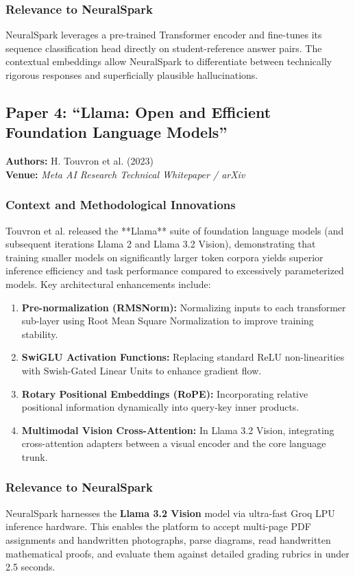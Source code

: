\subsubsection{Relevance to NeuralSpark}
NeuralSpark leverages a pre-trained Transformer encoder and fine-tunes its sequence classification head directly on student-reference answer pairs. The contextual embeddings allow NeuralSpark to differentiate between technically rigorous responses and superficially plausible hallucinations.

\subsection{Paper 4: ``Llama: Open and Efficient Foundation Language Models''}
\textbf{Authors:} H. Touvron et al. (2023) \cite{touvron2023} \\
\textbf{Venue:} \textit{Meta AI Research Technical Whitepaper / arXiv}

\subsubsection{Context and Methodological Innovations}
Touvron et al. released the **Llama** suite of foundation language models (and subsequent iterations Llama 2 and Llama 3.2 Vision), demonstrating that training smaller models on significantly larger token corpora yields superior inference efficiency and task performance compared to excessively parameterized models. Key architectural enhancements include:
\begin{enumerate}[leftmargin=*]
    \item \textbf{Pre-normalization (RMSNorm):} Normalizing inputs to each transformer sub-layer using Root Mean Square Normalization to improve training stability.
    \item \textbf{SwiGLU Activation Functions:} Replacing standard ReLU non-linearities with Swish-Gated Linear Units to enhance gradient flow.
    \item \textbf{Rotary Positional Embeddings (RoPE):} Incorporating relative positional information dynamically into query-key inner products.
    \item \textbf{Multimodal Vision Cross-Attention:} In Llama 3.2 Vision, integrating cross-attention adapters between a visual encoder and the core language trunk.
\end{enumerate}

\subsubsection{Relevance to NeuralSpark}
NeuralSpark harnesses the \textbf{Llama 3.2 Vision} model via ultra-fast Groq LPU inference hardware. This enables the platform to accept multi-page PDF assignments and handwritten photographs, parse diagrams, read handwritten mathematical proofs, and evaluate them against detailed grading rubrics in under 2.5 seconds.

